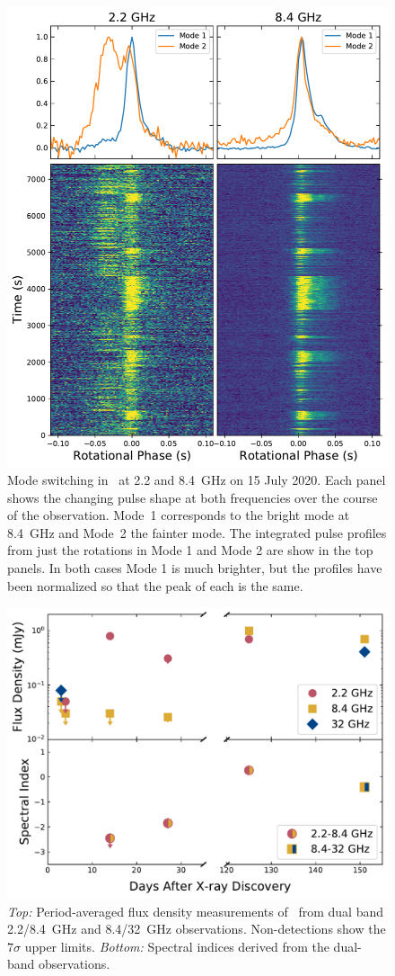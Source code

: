 \documentclass[twocolumn]{emulateapj}
\begin{document}
\begin{figure}[b]
	\centering
	\includegraphics[width=0.75\linewidth]{plots/sx-mode.pdf}
	\caption{Mode switching in \jmag\ at 2.2 and 8.4~GHz on 15 July 2020.  
             Each panel shows the changing pulse shape at both frequencies 
             over the course of the observation.  Mode~1 corresponds to 
             the bright mode at 8.4~GHz and Mode~2 the fainter mode.  The 
             integrated pulse profiles from just the rotations in Mode 1 
             and Mode 2 are show in the top panels.  In both cases Mode 1 
             is much brighter, but the profiles have been normalized so that 
             the peak of each is the same.}
	\label{fig:modes}
\end{figure}


\begin{figure}[b]
	\centering
	\includegraphics[width=0.75\linewidth]{plots/J1818_flux_spec.pdf}
	\caption{\emph{Top:} Period-averaged flux density measurements of 
             \jmag\ from dual band 2.2/8.4~GHz and 8.4/32~GHz observations. 
             Non-detections show the $7\sigma$ upper limits.  \emph{Bottom:} 
             Spectral indices derived from the dual-band observations.}
	\label{fig:flux_spec}
\end{figure}
\end{document}
